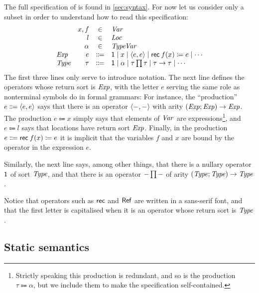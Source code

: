 The full specification of \langrecref{} is found in \cref{sec:syntax}. For now let us consider only a subset in order to understand how to read this specification:
%
\begin{equation*}
    \begin{array}{lrcl}
            & x,f & \in & \setVar \\
            & l & \in & \setLoc \\
            & \alpha & \in & \setTVar \\
        \setExp 
            & e    & \Coloneqq & \expUnit
                                 \mid x
                                 \mid \expPair{e}{e}
                                 \mid \expRec{f}{x}{e}
                                 \mid \cdots \\
        \setType
            & \tau & \Coloneqq & \typeUnit
                                 \mid \alpha
                                 \mid \typeProd{\tau}{\tau}
                                 \mid \typeFunc{\tau}{\tau}
                                 \mid \cdots
    \end{array}
\end{equation*}
%
The first three lines only serve to introduce notation. The next line defines the operators whose return sort is $\mathit{Exp}$, with the letter $e$ serving the same role as nonterminal symbols do in formal grammars: For instance, the \enquote{production} $e \Coloneqq \langle\textcolor{black}{e},\textcolor{black}{e}\rangle$ says that there is an operator $\langle\textcolor{black}{-},\textcolor{black}{-}\rangle$ with arity $(\mathit{Exp}; \mathit{Exp}) \to \mathit{Exp}$. The production $e \Coloneqq x$ simply says that elements of $\mathit{Var}$ are expressions\footnote{Strictly speaking this production is redundant, and so is the production $\tau \Coloneqq \alpha$, but we include them to make the specification self-contained.}, and $e \Coloneqq l$ says that locations have return sort $\mathit{Exp}$. Finally, in the production $e \Coloneqq \expRec{f}{x}{e}$ it is implicit that the variables $f$ and $x$ are bound by the operator in the expression $e$.

Similarly, the next line says, among other things, that there is a nullary operator $\mathsf{1}$ of sort $\mathit{Type}$, and that there is an operator $\typeProd{-}{-}$ of arity $(\mathit{Type};\mathit{Type}) \to \mathit{Type}$.

Notice that operators such as $\mathsf{rec}$ and $\mathsf{Ref}$ are written in a sans-serif font, and that the first letter is capitalised when it is an operator whose return sort is $\mathit{Type}$.


\subsection{Static semantics}

